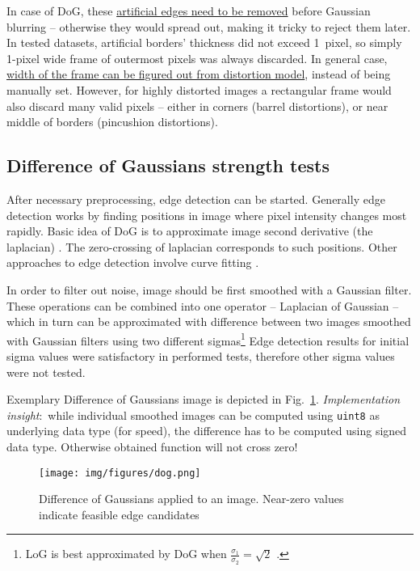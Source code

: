 In case of DoG, these \underline{artificial edges need to be removed} before Gaussian blurring -- otherwise they would spread out, making it tricky to reject them later. In tested datasets, artificial borders' thickness did not exceed 1~pixel, so simply 1-pixel wide frame of outermost pixels was always discarded. In general case, \underline{width of the frame can be figured out from distortion model}, instead of being manually set. However, for highly distorted images a rectangular frame would also discard many valid pixels -- either in corners (barrel distortions), or near middle of borders (pincushion distortions).

\subsection{Difference of Gaussians strength tests}

After necessary preprocessing, edge detection can be started. Generally edge detection works by finding positions in image where pixel intensity changes most rapidly. Basic idea of DoG is to approximate image second derivative (the laplacian) \cite{szeliski} \cite{jain1995machine}. The zero-crossing of laplacian corresponds to such positions. Other approaches to edge detection involve curve fitting \cite{fabijanska} \cite{devernay1995non} \cite{wei2010two}.

In order to filter out noise, image should be first smoothed with a Gaussian filter. These operations can be combined into one operator -- Laplacian of Gaussian -- which in turn can be approximated with difference between two images smoothed with Gaussian filters using two different sigmas\footnote{LoG is best approximated by DoG when $\frac{\sigma_{1}}{\sigma_{2}} = \sqrt{2}$ \cite{sift}.} Edge detection results for initial sigma values were satisfactory in performed tests, therefore other sigma values were not tested.

Exemplary Difference of Gaussians image is depicted in Fig.~\ref{fig:dog}. \textit{Implementation insight}:~while individual smoothed images can be computed using {\tt uint8} as underlying data type (for speed), the difference has to be computed using signed data type. Otherwise obtained function will not cross zero!

\begin{figure}[ht]
	\centering\texttt{[image: img/figures/dog.png]}
	\caption{ Difference of Gaussians applied to an image. Near-zero values indicate feasible edge candidates }
	\label{fig:dog}
\end{figure}

